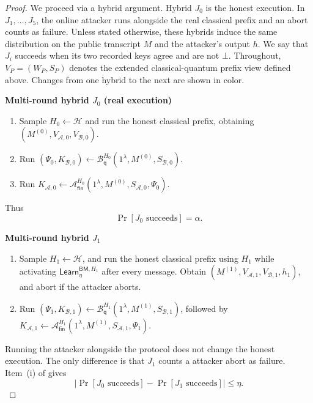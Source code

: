 \documentclass[11pt]{article}
\newcommand{\cA}{\mathcal{A}}
\newcommand{\cB}{\mathcal{B}}
\newcommand{\cH}{\mathcal{H}}
\newcommand{\Learn}{\mathsf{Learn}}
\newcommand{\changed}[1]{\textcolor{purple!75!black}{#1}}
\newcommand{\mrchanged}[1]{\changed{#1}}
\newenvironment{hybrid}[1]{%
  \par\medskip
  \noindent\textbf{#1}
  \begin{enumerate}[leftmargin=2.5em,label=\arabic*.,itemsep=0.25em,topsep=0.35em]
}{%
  \end{enumerate}
  \medskip
}
\begin{document}
\begin{proof}
We proceed via a hybrid argument. Hybrid \(J_0\) is the honest execution. In \(J_1,\ldots,J_5\), the online
attacker runs alongside the real classical prefix and an abort counts as
failure. Unless stated otherwise, these hybrids induce the same distribution
on the public transcript \(M\) and the attacker's output \(h\). We say that
\(J_i\) succeeds when its two recorded keys agree and are not \(\bot\).
Throughout, \(V_P=(W_P,S_P)\) denotes the extended classical-quantum
prefix view defined above. Changes from one hybrid to the next are shown in
\mrchanged{color}.

\begin{hybrid}{Multi-round hybrid \(J_0\) (real execution)}
  \item Sample \(H_0\leftarrow\cH\) and run the honest classical prefix,
  obtaining
  \((M^{(0)},V_{\cA,0},V_{\cB,0})\).
  \item Run
  \((\Psi_0,K_{\cB,0})\leftarrow
    \cB_{\mathsf q}^{H_0}(1^\lambda,M^{(0)},S_{\cB,0})\).
  \item Run
  \(K_{\cA,0}\leftarrow
    \cA_{\mathsf{fin}}^{H_0}
    (1^\lambda,M^{(0)},S_{\cA,0},\Psi_0)\).
\end{hybrid}
Thus
\nopagebreak[4]
\[
  \Pr[J_0\text{ succeeds}]=\alpha.
\]

\begin{hybrid}{Multi-round hybrid \(J_1\)}
  \item \mrchanged{Sample \(H_1\leftarrow\cH\), and run the honest
  classical prefix using \(H_1\) while activating
  \(\Learn^{\mathsf{BM},H_1}_\eta\) after every message.  Obtain
  \((M^{(1)},V_{\cA,1},V_{\cB,1},h_1)\), and abort if the attacker aborts.}
  \item Run
  \((\Psi_1,K_{\cB,1})\leftarrow
    \cB_{\mathsf q}^{H_1}(1^\lambda,M^{(1)},S_{\cB,1})\), followed by
  \(K_{\cA,1}\leftarrow
    \cA_{\mathsf{fin}}^{H_1}
    (1^\lambda,M^{(1)},S_{\cA,1},\Psi_1)\).
\end{hybrid}
Running the attacker alongside the protocol does not change the honest
execution. The only difference is that \(J_1\) counts a attacker abort as
failure. Item~(i) of
 gives
\begin{equation}
\label{eq:multi-j0-j1}
  \left|
    \Pr[J_0\text{ succeeds}]-\Pr[J_1\text{ succeeds}]
  \right|
  \le\eta.
\end{equation}


\end{proof}
\end{document}
